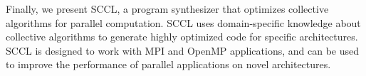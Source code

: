 Finally, we present SCCL, a program synthesizer that optimizes collective
algorithms for parallel computation. SCCL uses domain-specific knowledge
about collective algorithms to generate highly optimized code for
specific architectures. SCCL is designed to work with MPI and OpenMP
applications, and can be used to improve the performance of parallel
applications on novel architectures.






\begin{comment}


The rapid evolution of computer hardware introduces novel
architectures that demand efficient utilization for optimal performance.
These innovative architectures enhance the capabilities of processors,
enabling them to perform more complex tasks and improve overall efficiency.
%
For example, GPUs achieve high performance by utilizing specialized hardware
features specifically designed to optimize parallel processing and
computational tasks, and the Vector Processing Units (VPUs) within CPUs
are designed to handle vector operations efficiently,
making them particularly well-suited to applications
 such as video encoding, compression,
and image processing applications.
%
These cutting-edge new architectures are gathering significant interest
from software developers and researchers.

Programs running on top of these new architectures are either
optimized manually by human experts, or optimized by optimizing compilers.
However, both approaches struggle to keep pace
with innovations in architecture, as
the features in those new architectures may not be fully supported
or understood by existing compilers and experts;
%
additionally, optimizing compilers and experts usually rely on heuristics
to determine the best optimization strategies.
%
These heuristics might not be tailored to the specific features
of novel architectures, leading to suboptimal performance.
%
Consequently, efficiently optimizing programs for new architectures remains
a challenging endeavor.

Program synthesis is a promising approach to address the challenge.
%
At its core, program synthesis searches for programs
that meet a specified set of requirements.
%
Nowadays, the advances in SMT solvers and increased computation power
have made program synthesis a more viable choice for code generation.
%
There are several reasons why program synthesis can help address the challenge:


\end{comment}
